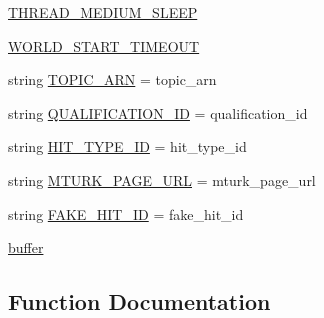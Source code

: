 \begin{DoxyCompactItemize}
\item 
\hyperlink{namespaceparlai_1_1mturk_1_1core_1_1test_1_1test__full__system_ad724042ffdcfc5832d1a262afd5a1392}{T\+H\+R\+E\+A\+D\+\_\+\+M\+E\+D\+I\+U\+M\+\_\+\+S\+L\+E\+EP}
\item 
\hyperlink{namespaceparlai_1_1mturk_1_1core_1_1test_1_1test__full__system_ae15854977e1fb912760470da7546ab65}{W\+O\+R\+L\+D\+\_\+\+S\+T\+A\+R\+T\+\_\+\+T\+I\+M\+E\+O\+UT}
\item 
string \hyperlink{namespaceparlai_1_1mturk_1_1core_1_1test_1_1test__full__system_a75efa69c3dd48d0a71efc49349bddbbf}{T\+O\+P\+I\+C\+\_\+\+A\+RN} = \textquotesingle{}topic\+\_\+arn\textquotesingle{}
\item 
string \hyperlink{namespaceparlai_1_1mturk_1_1core_1_1test_1_1test__full__system_a3d842545b7459f02c70ffa51b0e04d1e}{Q\+U\+A\+L\+I\+F\+I\+C\+A\+T\+I\+O\+N\+\_\+\+ID} = \textquotesingle{}qualification\+\_\+id\textquotesingle{}
\item 
string \hyperlink{namespaceparlai_1_1mturk_1_1core_1_1test_1_1test__full__system_a7c1f220f2cee5d2715906285c7dddf05}{H\+I\+T\+\_\+\+T\+Y\+P\+E\+\_\+\+ID} = \textquotesingle{}hit\+\_\+type\+\_\+id\textquotesingle{}
\item 
string \hyperlink{namespaceparlai_1_1mturk_1_1core_1_1test_1_1test__full__system_a4322c507df7048545a1899612304a63e}{M\+T\+U\+R\+K\+\_\+\+P\+A\+G\+E\+\_\+\+U\+RL} = \textquotesingle{}mturk\+\_\+page\+\_\+url\textquotesingle{}
\item 
string \hyperlink{namespaceparlai_1_1mturk_1_1core_1_1test_1_1test__full__system_ad5b7da2e381083bfed0571d46458b909}{F\+A\+K\+E\+\_\+\+H\+I\+T\+\_\+\+ID} = \textquotesingle{}fake\+\_\+hit\+\_\+id\textquotesingle{}
\item 
\hyperlink{namespaceparlai_1_1mturk_1_1core_1_1test_1_1test__full__system_aa6ab964049364dcfb975c093da8459d0}{buffer}
\end{DoxyCompactItemize}


\subsection{Function Documentation}
\mbox{\label{namespaceparlai_1_1mturk_1_1core_1_1test_1_1test__full__system_a0b463246d35658a2e422010f13dcf819}} 
